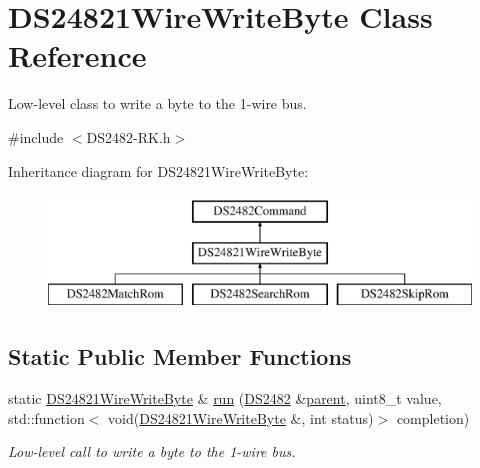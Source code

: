 \hypertarget{class_d_s24821_wire_write_byte}{}\section{D\+S24821\+Wire\+Write\+Byte Class Reference}
\label{class_d_s24821_wire_write_byte}


Low-\/level class to write a byte to the 1-\/wire bus.  




{\ttfamily \#include $<$D\+S2482-\/\+R\+K.\+h$>$}

Inheritance diagram for D\+S24821\+Wire\+Write\+Byte\+:\begin{figure}[H]
\begin{center}
\leavevmode
\includegraphics[height=3.000000cm]{class_d_s24821_wire_write_byte}
\end{center}
\end{figure}
\subsection*{Static Public Member Functions}
\begin{DoxyCompactItemize}
\item 
\mbox{\label{class_d_s24821_wire_write_byte_a2398d9539b7038f70e277b204f4e8ead}} 
static \mbox{\hyperlink{class_d_s24821_wire_write_byte}{D\+S24821\+Wire\+Write\+Byte}} \& \mbox{\hyperlink{class_d_s24821_wire_write_byte_a2398d9539b7038f70e277b204f4e8ead}{run}} (\mbox{\hyperlink{class_d_s2482}{D\+S2482}} \&\mbox{\hyperlink{class_d_s2482_command_a54a41fb8a610ef2077f5e5377771aaf3}{parent}}, uint8\+\_\+t value, std\+::function$<$ void(\mbox{\hyperlink{class_d_s24821_wire_write_byte}{D\+S24821\+Wire\+Write\+Byte}} \&, int status)$>$ completion)
\begin{DoxyCompactList}\small\item\em Low-\/level call to write a byte to the 1-\/wire bus. \end{DoxyCompactList}\end{DoxyCompactItemize}
